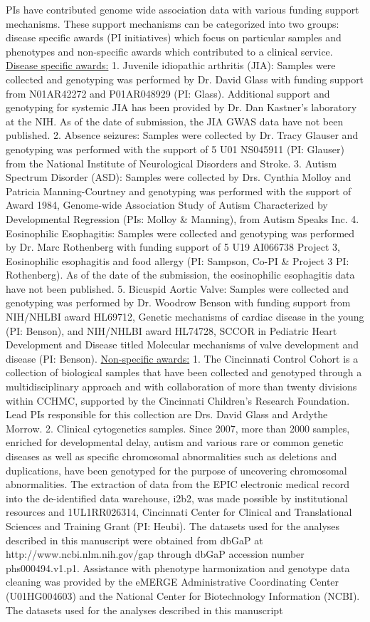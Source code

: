 \documentclass[12pt]{article}
\begin{document}
PIs have contributed genome wide association data with various funding support mechanisms. These support mechanisms can be categorized into two groups: disease specific awards (PI initiatives) which focus on particular samples and phenotypes and non-specific awards which contributed to a clinical service. \underline{Disease specific awards:} 1. Juvenile idiopathic arthritis (JIA): Samples were collected and genotyping was performed by Dr. David Glass with funding support from N01AR42272 and P01AR048929 (PI: Glass). Additional support and genotyping for systemic JIA has been provided by Dr. Dan Kastner’s laboratory at the NIH. As of the date of submission, the JIA GWAS data have not been published. 2. Absence seizures: Samples were collected by Dr. Tracy Glauser and genotyping was performed with the support of 5 U01 NS045911 (PI: Glauser) from the National Institute of Neurological Disorders and Stroke. 3. Autism Spectrum Disorder (ASD): Samples were collected by Drs. Cynthia Molloy and Patricia Manning-Courtney and genotyping was performed with the support of Award 1984, Genome-wide Association Study of Autism Characterized by Developmental Regression (PIs: Molloy \& Manning), from Autism Speaks Inc. 4. Eosinophilic Esophagitis: Samples were collected and genotyping was performed by Dr. Marc Rothenberg with funding support of 5 U19 AI066738 Project 3, Eosinophilic esophagitis and food allergy (PI: Sampson, Co-PI \& Project 3 PI: Rothenberg). As of the date of the submission, the eosinophilic esophagitis data have not been published. 5. Bicuspid Aortic Valve: Samples were collected and genotyping was performed by Dr. Woodrow Benson with funding support from NIH/NHLBI award HL69712, Genetic mechanisms of cardiac disease in the young (PI: Benson), and NIH/NHLBI award HL74728, SCCOR in Pediatric Heart Development and Disease titled Molecular mechanisms of valve development and disease (PI: Benson). \underline{Non-specific awards:} 1. The Cincinnati Control Cohort is a collection of biological samples that have been collected and genotyped through a multidisciplinary approach and with collaboration of more than twenty divisions within CCHMC, supported by the Cincinnati Children’s Research Foundation. Lead PIs responsible for this collection are Drs. David Glass and Ardythe Morrow. 2. Clinical cytogenetics samples. Since 2007, more than 2000 samples, enriched for developmental delay, autism and various rare or common genetic diseases as well as specific chromosomal abnormalities such as deletions and duplications, have been genotyped for the purpose of uncovering chromosomal abnormalities. The extraction of data from the EPIC electronic medical record into the de-identified data warehouse, i2b2, was made possible by institutional resources and 1UL1RR026314, Cincinnati Center for Clinical and Translational Sciences and Training Grant (PI: Heubi). The datasets used for the analyses described in this manuscript were obtained from dbGaP at http://www.ncbi.nlm.nih.gov/gap through dbGaP accession number phs000494.v1.p1. Assistance with phenotype harmonization and genotype data cleaning was provided by the eMERGE Administrative Coordinating Center (U01HG004603) and the National Center for Biotechnology Information (NCBI). The datasets used for the analyses described in this manuscript 
\end{document}

